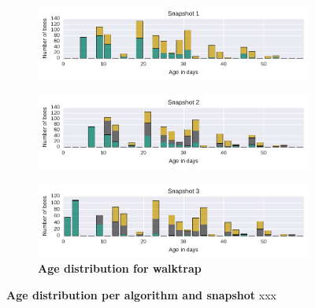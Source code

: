 \begin{figure}[htb]
\centering
	\begin{subfigure}[b]{1.0\textwidth}
	\centering
	\includegraphics[width=1.0\textwidth]{Figures/n1-ageDistribution-WT}
	\end{subfigure}
	\begin{subfigure}[b]{1.0\textwidth}
	\centering
	\includegraphics[width=1.0\textwidth]{Figures/n2-ageDistribution-WT}
	\end{subfigure}
	\begin{subfigure}[b]{1.0\textwidth}
	\centering
	\includegraphics[width=1.0\textwidth]{Figures/n3-ageDistribution-WTAppendix}
	\caption[Age distribution for walktrap]{\textbf{Age distribution for walktrap}}
	\label{fig:ageDistWT}
	\end{subfigure}
	\caption[Age distribution per algorithm and snapshot]{\textbf{Age distribution per algorithm and snapshot} xxx}
	\label{fig:ages}
\end{figure}


